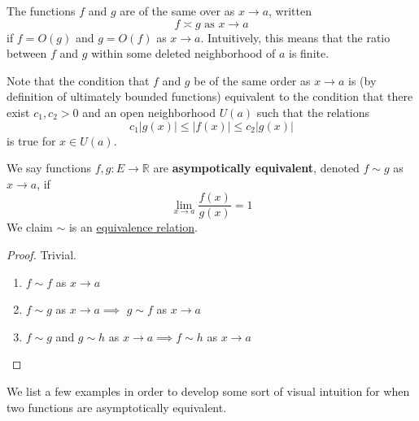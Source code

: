   \begin{definition}
    \label{def:functions-of-same-order}
    The functions $f$ and $g$ are of the same over as $x \to a$, written 
    \begin{equation}
      f \asymp g \text{ as } x \to a
    \end{equation}
    if $f = O(g)$ and $g = O(f)$ as $x \to a$. Intuitively, this means that the ratio between $f$ and $g$ within some deleted neighborhood of $a$ is finite. 

    Note that the condition that $f$ and $g$ be of the same order as $x \to a$ is (by definition of ultimately bounded functions) equivalent to the condition that there exist $c_1, c_2 > 0$ and an open neighborhood $U (a)$ such that the relations
    \begin{equation}
      c_1 |g(x)| \leq |f(x)| \leq c_2 |g(x)|
    \end{equation}
    is true for $x \in U(a)$. 
  \end{definition}

  \begin{definition}
    \label{def:asymptotic-equivalence-of-functions}
		We say functions $f, g: E \to \mathbb{R}$ are \textbf{asympotically equivalent}, denoted $f \sim g$ as $x \to a$, if 
    \begin{equation}
      \lim_{x \to a} \frac{f(x)}{g(x)} = 1
    \end{equation}
		We claim $\sim$ is an \hyperref[st-def:equivalence_relation]{equivalence relation}. 
  \end{definition}
	\begin{proof}
	  Trivial. 
    \begin{enumerate}
      \item $f \sim f$ as $x \to a$
      \item $f \sim g$ as $x \to a \implies$ $g \sim f$ as $x \to a$
      \item $f \sim g$ and $g \sim h$ as $x \to a \implies f \sim h$ as $x \to a$
    \end{enumerate}
	\end{proof}

  We list a few examples in order to develop some sort of visual intuition for when two functions are asymptotically equivalent. 

